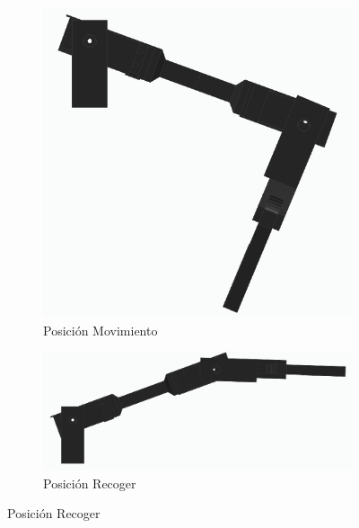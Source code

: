 \begin{figure}[H]
    \centering
    \begin{subfigure}[b]{0.45\textwidth}
        \centering
        \includegraphics[width=\textwidth]{imagenes/brazo_movimiento.png}
        \caption{Posición Movimiento}
    \end{subfigure}
    \hfill
    \begin{subfigure}[b]{0.45\textwidth}
        \centering
        \includegraphics[width=\textwidth]{imagenes/brazo_recoger.png}
        \caption{Posición Recoger}
    \end{subfigure}

    \vspace{0.5cm}


\end{figure}

